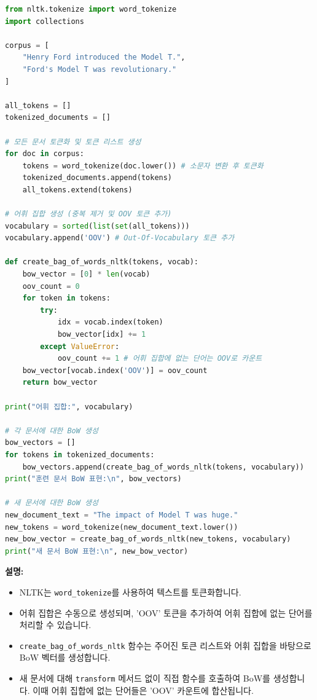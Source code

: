 \documentclass[11pt,a4paper]{article}
\begin{document}
\begin{lstlisting}[language=Python, caption={NLTK를 이용한 BoW 생성}, label=lst:nltk_bow]
from nltk.tokenize import word_tokenize
import collections

corpus = [
    "Henry Ford introduced the Model T.",
    "Ford's Model T was revolutionary."
]

all_tokens = []
tokenized_documents = []

# 모든 문서 토큰화 및 토큰 리스트 생성
for doc in corpus:
    tokens = word_tokenize(doc.lower()) # 소문자 변환 후 토큰화
    tokenized_documents.append(tokens)
    all_tokens.extend(tokens)

# 어휘 집합 생성 (중복 제거 및 OOV 토큰 추가)
vocabulary = sorted(list(set(all_tokens)))
vocabulary.append('OOV') # Out-Of-Vocabulary 토큰 추가

def create_bag_of_words_nltk(tokens, vocab):
    bow_vector = [0] * len(vocab)
    oov_count = 0
    for token in tokens:
        try:
            idx = vocab.index(token)
            bow_vector[idx] += 1
        except ValueError:
            oov_count += 1 # 어휘 집합에 없는 단어는 OOV로 카운트
    bow_vector[vocab.index('OOV')] = oov_count
    return bow_vector

print("어휘 집합:", vocabulary)

# 각 문서에 대한 BoW 생성
bow_vectors = []
for tokens in tokenized_documents:
    bow_vectors.append(create_bag_of_words_nltk(tokens, vocabulary))
print("훈련 문서 BoW 표현:\n", bow_vectors)

# 새 문서에 대한 BoW 생성
new_document_text = "The impact of Model T was huge."
new_tokens = word_tokenize(new_document_text.lower())
new_bow_vector = create_bag_of_words_nltk(new_tokens, vocabulary)
print("새 문서 BoW 표현:\n", new_bow_vector)
\end{lstlisting}

\begin{examplebox}
\textbf{설명:}
\begin{itemize}
    \item NLTK는 \texttt{word\_tokenize}를 사용하여 텍스트를 토큰화합니다.
    \item 어휘 집합은 수동으로 생성되며, 'OOV' 토큰을 추가하여 어휘 집합에 없는 단어를 처리할 수 있습니다.
    \item \texttt{create\_bag\_of\_words\_nltk} 함수는 주어진 토큰 리스트와 어휘 집합을 바탕으로 BoW 벡터를 생성합니다.
    \item 새 문서에 대해 \texttt{transform} 메서드 없이 직접 함수를 호출하여 BoW를 생성합니다. 이때 어휘 집합에 없는 단어들은 'OOV' 카운트에 합산됩니다.
\end{itemize}
\end{examplebox}
\end{document}
